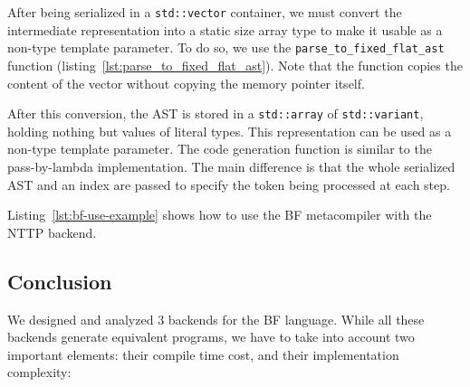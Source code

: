 \documentclass[../../main.tex]{subfiles}
\begin{document}
After being serialized in a \lstinline|std::vector| container, we must convert
the intermediate representation into a static size array type to make it usable
as a non-type template parameter. To do so, we use the
\lstinline|parse_to_fixed_flat_ast| function
(listing~\ref{lst:parse_to_fixed_flat_ast}). Note that the function copies the content of
the vector without copying the memory pointer itself.



After this conversion, the AST is stored in a \lstinline|std::array| of
\lstinline|std::variant|, holding nothing but values of literal types. This
representation can be used as a non-type template parameter. The code
generation function is similar to the pass-by-lambda implementation. The main
difference is that the whole serialized AST and an index are passed to specify
the token being processed at each step.

Listing~\ref{lst:bf-use-example} shows how to use the BF metacompiler with the
NTTP backend.

\subsection{Conclusion}

We designed and analyzed 3 backends for the BF language. While all these
backends generate equivalent programs, we have to take into account two
important elements: their compile time cost, and their implementation
complexity:
\end{document}

